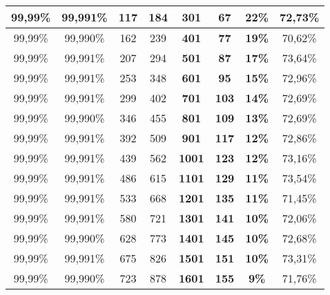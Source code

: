 \begin{table}[hbtp]
{\begin{tabular}{cccc
>{\columncolor[HTML]{8D3CE1}}c 
>{\columncolor[HTML]{5754D6}}c 
>{\columncolor[HTML]{8FFFFB}}c c}
99,99\% & 99,991\% & 117 & 184 & \textbf{301} & \textbf{67} & \textbf{22\%} & 72,73\% \\ \hline
\cellcolor[HTML]{C0C0C0}99,99\% & \cellcolor[HTML]{C0C0C0}99,990\% & \cellcolor[HTML]{C0C0C0}162 & \cellcolor[HTML]{C0C0C0}239 & \textbf{401} & \textbf{77} & \textbf{19\%} & \cellcolor[HTML]{C0C0C0}70,62\% \\ \hline
99,99\% & 99,991\% & 207 & 294 & \textbf{501} & \textbf{87} & \textbf{17\%} & 73,64\% \\ \hline
\cellcolor[HTML]{C0C0C0}99,99\% & \cellcolor[HTML]{C0C0C0}99,991\% & \cellcolor[HTML]{C0C0C0}253 & \cellcolor[HTML]{C0C0C0}348 & \textbf{601} & \textbf{95} & \textbf{15\%} & \cellcolor[HTML]{C0C0C0}72,96\% \\ \hline
99,99\% & 99,991\% & 299 & 402 & \textbf{701} & \textbf{103} & \textbf{14\%} & 72,69\% \\ \hline
\cellcolor[HTML]{C0C0C0}99,99\% & \cellcolor[HTML]{C0C0C0}99,990\% & \cellcolor[HTML]{C0C0C0}346 & \cellcolor[HTML]{C0C0C0}455 & \textbf{801} & \textbf{109} & \textbf{13\%} & \cellcolor[HTML]{C0C0C0}72,69\% \\ \hline
99,99\% & 99,991\% & 392 & 509 & \textbf{901} & \textbf{117} & \textbf{12\%} & 72,86\% \\ \hline
\cellcolor[HTML]{C0C0C0}99,99\% & \cellcolor[HTML]{C0C0C0}99,991\% & \cellcolor[HTML]{C0C0C0}439 & \cellcolor[HTML]{C0C0C0}562 & \textbf{1001} & \textbf{123} & \textbf{12\%} & \cellcolor[HTML]{C0C0C0}73,16\% \\ \hline
99,99\% & 99,991\% & 486 & 615 & \textbf{1101} & \textbf{129} & \textbf{11\%} & 73,54\% \\ \hline
\cellcolor[HTML]{C0C0C0}99,99\% & \cellcolor[HTML]{C0C0C0}99,991\% & \cellcolor[HTML]{C0C0C0}533 & \cellcolor[HTML]{C0C0C0}668 & \textbf{1201} & \textbf{135} & \textbf{11\%} & \cellcolor[HTML]{C0C0C0}71,45\% \\ \hline
99,99\% & 99,991\% & 580 & 721 & \textbf{1301} & \textbf{141} & \textbf{10\%} & 72,06\% \\ \hline
\cellcolor[HTML]{C0C0C0}99,99\% & \cellcolor[HTML]{C0C0C0}99,990\% & \cellcolor[HTML]{C0C0C0}628 & \cellcolor[HTML]{C0C0C0}773 & \textbf{1401} & \textbf{145} & \textbf{10\%} & \cellcolor[HTML]{C0C0C0}72,68\% \\ \hline
99,99\% & 99,991\% & 675 & 826 & \textbf{1501} & \textbf{151} & \textbf{10\%} & 73,31\% \\ \hline
\cellcolor[HTML]{C0C0C0}99,99\% & \cellcolor[HTML]{C0C0C0}99,990\% & \cellcolor[HTML]{C0C0C0}723 & \cellcolor[HTML]{C0C0C0}878 & \textbf{1601} & \textbf{155} & \textbf{9\%} & \cellcolor[HTML]{C0C0C0}71,76\% \\ \hline

\end{tabular}}
\end{table}
